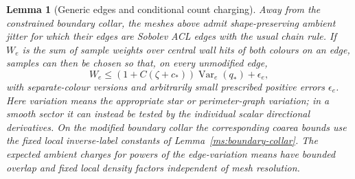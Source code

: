 \documentclass[11pt]{article}
\numberwithin{equation}{section}
\newtheorem{lemma}[theorem]{Lemma}
\theoremstyle{definition}
\theoremstyle{remark}
\begin{document}
\begin{lemma}[Generic edges and conditional count charging]
\label{ms:edge-tests}
Away from the constrained boundary collar, the meshes above admit
shape-preserving ambient jitter for which their edges are Sobolev ACL
edges with the usual chain rule.  If $W_e$ is the sum of sample weights
over central wall hits of both colours on an edge, samples can then be
chosen so that, on every unmodified edge,
\begin{equation}
 W_e\le (1+C(\zeta+c_*))\operatorname{Var}_e(q_*)+\epsilon_e,
 \label{ms:weighted-count}
\end{equation}
with separate-colour versions and arbitrarily small prescribed
positive errors $\epsilon_e$.  Here variation means the appropriate
star or perimeter-graph variation; in a smooth sector it can instead
be tested by the individual scalar directional derivatives.  On the
modified boundary collar the corresponding coarea bounds use the fixed
local inverse-label constants of Lemma~\ref{ms:boundary-collar}.
The expected ambient charges for powers of the edge-variation means have
bounded overlap and fixed local density factors independent of mesh
resolution.
\end{lemma}
\end{document}
